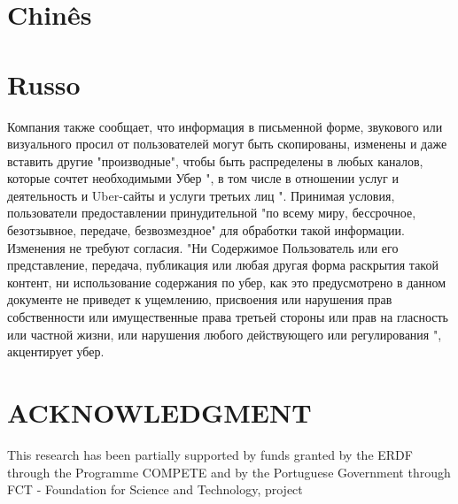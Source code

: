 \section*{Chinês}
\par{}\protect{}
\section*{Russo}
\par{}Компания также сообщает, что информация в письменной форме, звукового или визуального просил от пользователей могут быть скопированы, изменены и даже вставить другие "производные", чтобы быть распределены в любых каналов, которые сочтет необходимыми Убер ", в том числе в отношении услуг и деятельность и Uber-сайты и услуги третьих лиц ". Принимая условия, пользователи предоставлении принудительной "по всему миру, бессрочное, безотзывное, передаче, безвозмездное" для обработки такой информации. Изменения не требуют \protect{} согласия.
"Ни Содержимое Пользователь или его представление, передача, публикация или любая другая форма раскрытия такой \protect{} контент, ни использование содержания по убер, как это предусмотрено в данном документе не приведет к ущемлению, присвоения или нарушения прав собственности \protect{} или имущественные права третьей стороны или прав на гласность или \protect{} частной жизни, или нарушения любого действующего \protect{} или регулирования ", акцентирует убер.

\section*{ACKNOWLEDGMENT}
\par{}This research has been partially supported by funds granted by the ERDF through the
            Programme COMPETE and by the Portuguese Government through FCT - Foundation for Science
            and Technology, project \protect{}
